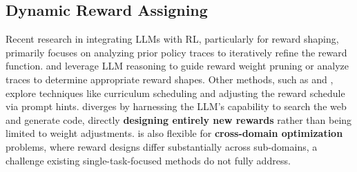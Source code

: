 
\subsection{Dynamic Reward Assigning}



Recent research in integrating LLMs with RL, particularly for reward shaping, primarily focuses on analyzing prior policy traces to iteratively refine the reward function. \citet{afonso2025selfcorrectingrewardshapinglanguage} and \citet{eager-2022} leverage LLM reasoning to guide reward weight pruning or analyze traces to determine appropriate reward shapes. Other methods, such as \citet{logicRL} and \citet{dynamic-rewarding-2024-emnlp}, explore techniques like curriculum scheduling and adjusting the reward schedule via prompt hints.
\method{} diverges by harnessing the LLM's capability to search the web and generate code, directly \textbf{designing entirely new rewards} rather than being limited to weight adjustments. \method{} is also flexible for \textbf{cross-domain optimization} problems, where reward designs differ substantially across sub-domains, a challenge existing single-task-focused methods do not fully address.